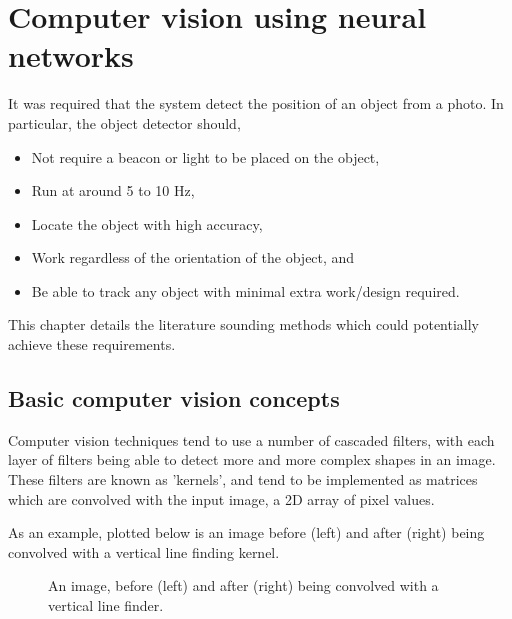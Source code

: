 \section{Computer vision using neural networks}
It was required that the system detect the position of an object from a photo. In particular, the object detector should,

\begin{itemize}
	\item Not require a beacon or light to be placed on the object,
	\item Run at around 5 to 10 Hz,
	\item Locate the object with high accuracy,
	\item Work regardless of the orientation of the object, and
	\item Be able to track any object with minimal extra work/design required.
\end{itemize}

This chapter details the literature sounding methods which could potentially achieve these requirements.

\subsection{Basic computer vision concepts}
Computer vision techniques tend to use a number of cascaded filters, with each layer of filters being able to detect more and more complex shapes in an image. These filters are known as 'kernels', and tend to be implemented as  matrices which are convolved with the input image, a 2D array of pixel values.

As an example, plotted below is an image before (left) and after (right) being convolved with a vertical line finding kernel.

\begin{figure}[h!]%
    \centering
    \qquad \qquad
    \caption{An image, before (left) and after (right) being convolved with a vertical line finder.}%
    \label{fig:example}%
\end{figure}

